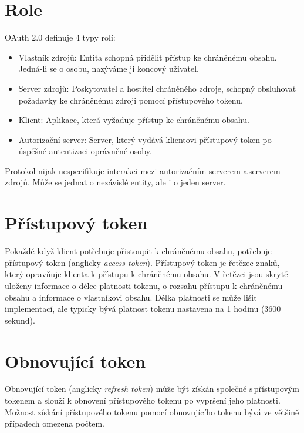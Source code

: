 \documentclass[]{fithesis3}
\begin{document}
	\section{Role}
		OAuth 2.0 definuje 4 typy rolí:

		\begin{itemize}
 		\item Vlastník zdrojů:
  		\newline
		Entita schopná přidělit přístup ke chráněnému obsahu. Jedná-li se o osobu, nazýváme ji 			koncový uživatel.
  		\item Server zdrojů:
  		\newline
		Poskytovatel a hostitel chráněného zdroje, schopný obsluhovat požadavky ke 					chráněnému zdroji pomocí přístupového tokenu.
 	 	\item Klient:
  		\newline
		Aplikace, která vyžaduje přístup ke chráněnému obsahu.
  		\item Autorizační server:
 		\newline
		Server, který vydává klientovi přístupový token po úspěšné autentizaci oprávněné osoby.
		\end{itemize}
		Protokol nijak nespecifikuje interakci mezi autorizačním serverem a\,serverem zdrojů. 				Může se jednat o nezávislé entity, ale i o jeden server.

	\section{Přístupový token}	

	Pokaždé když klient potřebuje přistoupit k chráněnému obsahu, potřebuje přístupový token 			(anglicky \textit{access token}). Přístupový token je řetězec znaků, který opravňuje klienta k 		přístupu k chráněnému obsahu. V řetězci jsou skrytě uloženy informace o délce platnosti 			tokenu, o rozsahu přístupu k chráněnému obsahu a informace o vlastníkovi obsahu. Délka 			platnosti se může lišit implementací, ale typicky bývá platnost tokenu nastavena na 1 hodinu 		(3600 sekund).

	\section{Obnovující token}	

	Obnovující token (anglicky \textit{refresh token}) může být získán společně s\,přístupovým 			tokenem a slouží k obnovení přístupového tokenu po vypršení jeho platnosti. Možnost získání 		přístupového tokenu pomocí obnovujícího tokenu bývá ve většině případech omezena počtem. 
\end{document}
